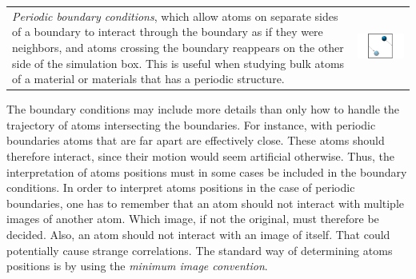 \documentclass[twoside,english]{uiofysmaster}
\begin{document}
\begin{tabular}{p{} p{}}
	 \vspace{0pt} {\it Periodic boundary conditions}, which allow atoms on separate sides of a boundary to interact through the boundary as if they were neighbors, and atoms crossing the boundary reappears on the other side of the simulation box. This is useful when studying bulk atoms of a material or materials that has a periodic structure.
	& \vspace{0pt} \hspace*{-1.3cm} \includegraphics[width=1.3\linewidth]{figures/BoundaryConditions/periodic.pdf}
\end{tabular}
\vspace{10mm}

\noindent
The boundary conditions may include more details than only how to handle the trajectory of atoms intersecting the boundaries. 
For instance, with periodic boundaries atoms that are far apart are effectively close. 
These atoms should therefore interact, since their motion would seem artificial otherwise. 
Thus, the interpretation of atoms positions must in some cases be included in the boundary conditions. 
In order to interpret atoms positions in the case of periodic boundaries, one has to remember that an atom should not interact with multiple images of another atom. 
Which image, if not the original, must therefore be decided. 
Also, an atom should not interact with an image of itself. That could potentially cause strange correlations. 
The standard way of determining atoms positions is by using the {\it minimum image convention}.
\end{document}
